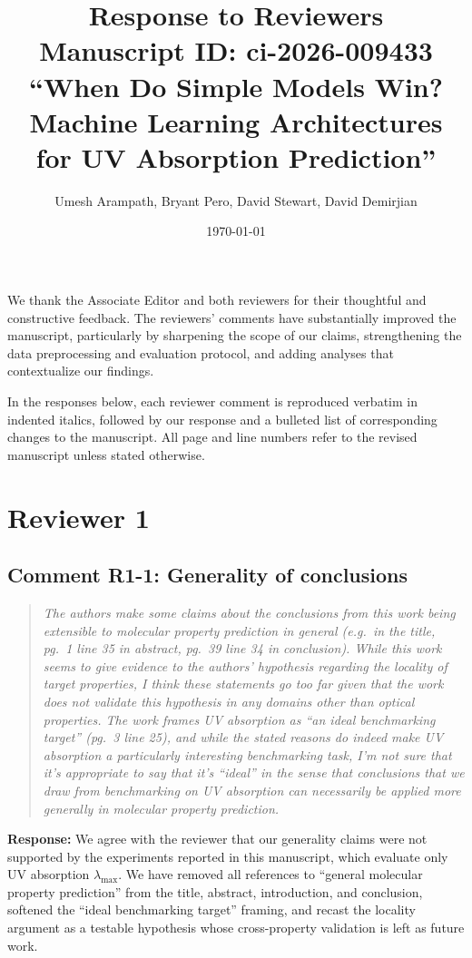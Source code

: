 \documentclass[11pt]{article}
\title{Response to Reviewers\\
\large Manuscript ID: ci-2026-009433\\
``When Do Simple Models Win? Machine Learning Architectures for UV Absorption Prediction''}
\author{Umesh Arampath, Bryant Pero, David Stewart, David Demirjian}
\date{\today}
\newenvironment{reviewer}{%
  \begin{quote}\itshape\color{black!70}}{%
  \end{quote}}
\newcommand{\response}[1]{\noindent\textbf{Response:} #1\par\medskip}
\begin{document}
\maketitle

We thank the Associate Editor and both reviewers for their thoughtful and constructive feedback. The reviewers' comments have substantially improved the manuscript, particularly by sharpening the scope of our claims, strengthening the data preprocessing and evaluation protocol, and adding analyses that contextualize our findings.

In the responses below, each reviewer comment is reproduced verbatim in indented italics, followed by our response and a bulleted list of corresponding changes to the manuscript. All page and line numbers refer to the revised manuscript unless stated otherwise.


\clearpage

\section*{Reviewer 1}

\subsection*{Comment R1-1: Generality of conclusions}
\begin{reviewer}
The authors make some claims about the conclusions from this work being extensible to molecular property prediction in general (e.g.\ in the title, pg.\ 1 line 35 in abstract, pg.\ 39 line 34 in conclusion). While this work seems to give evidence to the authors' hypothesis regarding the locality of target properties, I think these statements go too far given that the work does not validate this hypothesis in any domains other than optical properties. The work frames UV absorption as ``an ideal benchmarking target'' (pg.\ 3 line 25), and while the stated reasons do indeed make UV absorption a particularly interesting benchmarking task, I'm not sure that it's appropriate to say that it's ``ideal'' in the sense that conclusions that we draw from benchmarking on UV absorption can necessarily be applied more generally in molecular property prediction.
\end{reviewer}

\response{We agree with the reviewer that our generality claims were not supported by the experiments reported in this manuscript, which evaluate only UV absorption $\lambda_{\max}$. We have removed all references to ``general molecular property prediction'' from the title, abstract, introduction, and conclusion, softened the ``ideal benchmarking target'' framing, and recast the locality argument as a testable hypothesis whose cross-property validation is left as future work.}
\end{document}
